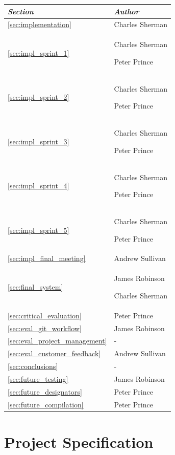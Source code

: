 \documentclass[a4paper, 12pt, twoside]{article}
\newcommand*{\fullref}[1]{\ref{#1} \nameref{#1}}
\begin{document}
\begin{tabularx}{\textwidth}{|X|X|} \hline
  \emph{Section}                         & \emph{Author}                      \\ \hline
  \fullref{sec:implementation}           & Charles Sherman                    \\
  \fullref{sec:impl_sprint_1}            & Charles Sherman\par Peter Prince   \\
  \fullref{sec:impl_sprint_2}            & Charles Sherman\par Peter Prince   \\
  \fullref{sec:impl_sprint_3}            & Charles Sherman\par Peter Prince   \\
  \fullref{sec:impl_sprint_4}            & Charles Sherman\par Peter Prince   \\
  \fullref{sec:impl_sprint_5}            & Charles Sherman\par Peter Prince   \\
  \fullref{sec:impl_final_meeting}       & Andrew Sullivan   \\ \hline
  \fullref{sec:final_system}             & James Robinson\par Charles Sherman \\ \hline
  \fullref{sec:critical_evaluation}        & Peter Prince                     \\
  \fullref{sec:eval_git_workflow}        & James Robinson                     \\
  \fullref{sec:eval_project_management}  & -                                  \\
  \fullref{sec:eval_customer_feedback}  & Andrew Sullivan  \\ \hline
  \fullref{sec:conclusions}              & -                                  \\ \hline
  \fullref{sec:future_testing}           & James Robinson                     \\
  \fullref{sec:future_designators}       & Peter Prince                       \\
  \fullref{sec:future_compilation}       & Peter Prince                       \\ \hline
\end{tabularx}

\section{Project Specification}
\end{document}
